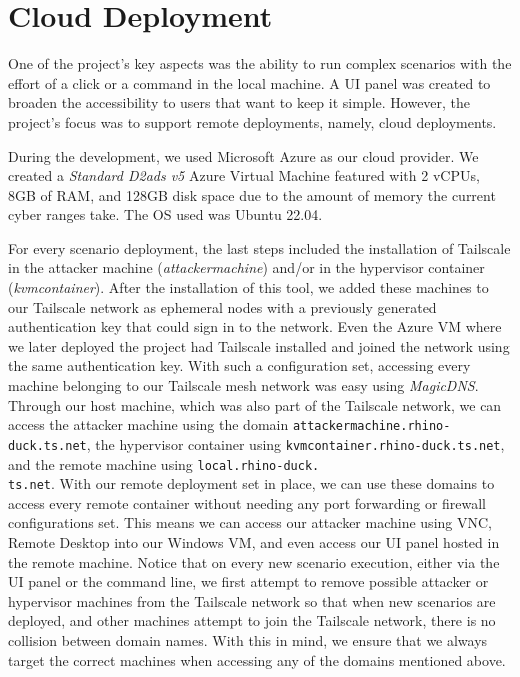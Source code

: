 
\section{Cloud Deployment} \label{sec:validation_cloud_deployment}

One of the project's key aspects was the ability to run complex scenarios with the effort of a click or a command in the local machine. A UI panel was created to broaden the accessibility to users that want to keep it simple. However, the project's focus was to support remote deployments, namely, cloud deployments.

During the development, we used Microsoft Azure as our cloud provider. We created a \textit{Standard D2ads v5} Azure Virtual Machine featured with 2 vCPUs, 8GB of RAM, and 128GB disk space due to the amount of memory the current cyber ranges take. The OS used was Ubuntu 22.04. 

For every scenario deployment, the last steps included the installation of Tailscale in the attacker machine (\textit{attackermachine}) and/or in the hypervisor container (\textit{kvmcontainer}). After the installation of this tool, we added these machines to our Tailscale network as ephemeral nodes with a previously generated authentication key that could sign in to the network. Even the Azure VM where we later deployed the project had Tailscale installed and joined the network using the same authentication key. With such a configuration set, accessing every machine belonging to our Tailscale mesh network was easy using \textit{MagicDNS}. Through our host machine, which was also part of the Tailscale network, we can access the attacker machine using the domain \texttt{attackermachine.rhino-duck.ts.net}, the hypervisor container using \texttt{kvmcontainer.rhino-duck.ts.net}, and the remote machine using \texttt{local.rhino-duck.\\ts.net}. With our remote deployment set in place, we can use these domains to access every remote container without needing any port forwarding or firewall configurations set. This means we can access our attacker machine using VNC, Remote Desktop into our Windows VM, and even access our UI panel hosted in the remote machine. Notice that on every new scenario execution, either via the UI panel or the command line, we first attempt to remove possible attacker or hypervisor machines from the Tailscale network so that when new scenarios are deployed, and other machines attempt to join the Tailscale network, there is no collision between domain names. With this in mind, we ensure that we always target the correct machines when accessing any of the domains mentioned above.

